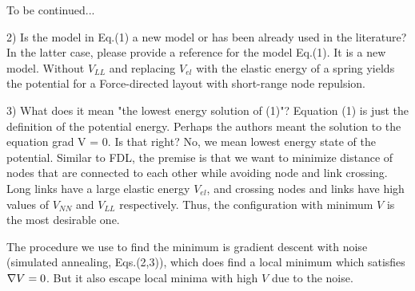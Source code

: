 \documentclass[11pt]{article}
\newcommand{\outNim}[1]{}
\begin{document}
\begin{response}
{\color{red} To be continued...}


\outNim{
The resolution is to use $N$ and $L$ of the 

What does matter is the size of the network and Eq.(4) is inaccurate unless we clarify the following. 
The main assumption of Eq.(4) is that the average length of links $R_L$ in any large region of the layout is the same. 
The accurate derivation of Eq.(4) comes from equating the total node volume $V_N \sim N r_N^3$ with the total link volume $V_L \sim R_L r_L^2$. 
Eq.(4) assumes that $R_L = c r_N $ is comparable to the layout radius. 
{\color{red}But this clearly fails in a 3D lattice and  geometric graphs. Talk about smallest unit cell that is repeated in these networks. The unit cell is what determines $N$ and $L$ to be used in Eq.(4). This will also solve the scaling issue.  }  
Eq.(4) predicts a transition when 
\[ \tilde{r}_c = {r_L\over r_N} = N^{1/3}L^{-1/2}\]
This would mean that if we double the number of nodes and links the transition would occur at $2^{-1/6} \tilde{r}_c$. 
However, in the weak phase a perfect cubic 3D lattice has $R_L=2r_N$ everywhere, regardless of the size of the lattice.
In a random graph, $R_L$ should grow uniformly with the layout radius, which itself grows with $N^{1/3}$ so $\tilde{r}_c$ does change. 


For the case of a lattice, in the perfect layout (i.e. lattice with no defect) the average link length is $R_L = 2r_N$. 
The number of links per node is $1$, so $L=N$. 
But this time, the average volume per each node is a cube of volume $r_N^3$ and the average volume excluded by each link not a cylinder, but a cuboid of volume $R_Lr_L^2$. 
Therefore, the link and node volumes become comparable when the thickness $r_L = r_N$ which is compatible with 
\[{r_L\over r_N} = \]
}


\end{response}
\begin{response}{
2) Is the model in Eq.(1) a new model or has been already used in the literature? In the latter case, please provide a reference for the model Eq.(1). 
}
It is a new model. 
Without $V_{LL}$ and replacing $V_{el}$ with the elastic energy of a spring yields the potential for a Force-directed layout with short-range node repulsion.  
\end{response}
\begin{response}{
3) What does it mean "the lowest energy solution of (1)"? Equation (1) is just the definition of the potential energy. Perhaps the authors meant the solution to the equation grad V = 0. Is that right?
}
No, we mean lowest energy state of the potential. 
Similar to FDL, the premise is that we want to minimize distance of nodes that are connected to each other while avoiding node and link crossing. 
Long links have a large elastic energy $V_{el}$, and crossing nodes and links have high values of $V_{NN}$ and $V_{LL}$ respectively. 
Thus, the configuration with minimum $V$ is the most desirable one. 

The procedure we use to find the minimum is gradient descent with noise (simulated annealing, Eqs.(2,3)), which does find a local minimum which satisfies $\nabla V = 0$. 
But it also escape local minima with high $V$ due to the noise. 
\end{response}
\end{document}
